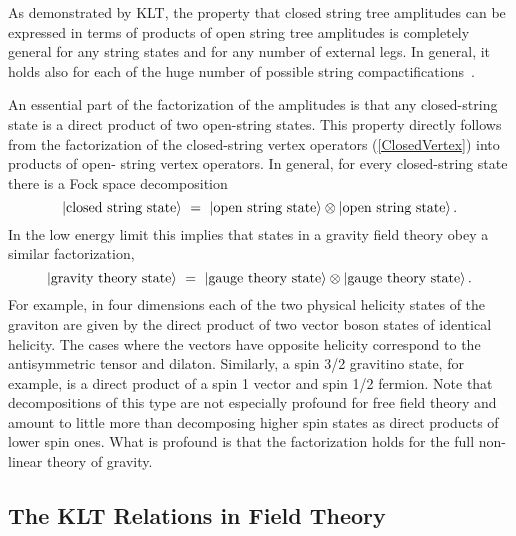 \documentclass[12pt]{livrev}
\begin{document}
As demonstrated by KLT, the property that closed string tree amplitudes
can be expressed in terms of products of open string tree amplitudes
is completely general for any string states and for any number of
external legs. In general, it holds also for each of the huge number
of possible string
compactifications~\cite{Narain86,Narain87,Dixon85,Dixon86,Kawai87,
Antoniadis87}.

 An essential part of the factorization of the amplitudes
is that any closed-string state is a direct product of two open-string
states.  This property directly follows from the factorization of the
closed-string vertex operators (\ref{ClosedVertex}) into products of open-
string vertex operators.  In general, for every closed-string
state there is a Fock space decomposition
%
\begin{equation}
\vert \hbox{closed string state} \rangle
\ =\ \vert  \hbox{open string state} \rangle 
\otimes \vert\hbox{open string state} \rangle \,.
\end{equation}
%
In the low energy limit this implies that states in a gravity field
theory obey a similar factorization, 
%
\begin{equation}
\vert \hbox{gravity theory state} \rangle
\ =\ \vert  \hbox{gauge theory state} \rangle 
\otimes \vert\hbox{gauge theory state} \rangle \,.
\label{StateFactorization}
\end{equation}
%
For example, in four dimensions each of the two physical helicity
states of the graviton are given by the direct product of two vector
boson states of identical helicity. The cases where the vectors have
opposite helicity correspond to the antisymmetric tensor and dilaton.
Similarly, a spin 3/2 gravitino state, for example, is a direct product
of a spin 1 vector and spin 1/2 fermion.  Note that decompositions of
this type are not especially profound for free field theory and
amount to little more than decomposing higher spin states as direct
products of lower spin ones.  What is profound is that the
factorization holds for the full non-linear theory of gravity.

\subsection{The KLT Relations in Field Theory}
\end{document}

